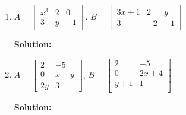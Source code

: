 \begin{enumerate}
\begin{banswer}
        \begin{tcolorbox}
            \centering
            $x=1,\qquad y=2$
        \end{tcolorbox}
    \end{banswer}

    \item 
    $A = \begin{bmatrix}
        x^3 & 2 & 0 \\
        3 & y & -1
    \end{bmatrix}$, \quad
    $B = \begin{bmatrix}
        3x + 1 & 2 & y \\
        3 & -2 & -1
    \end{bmatrix}$

    \textbf{Solution:}
    \begin{banswer}
    \end{banswer}

    \item 
    $A = \begin{bmatrix}
        2 & -5 \\
        0 & x + y \\
        2y & 3
    \end{bmatrix}$, \quad
    $B = \begin{bmatrix}
        2 & -5 \\    
        0 & 2x + 4 \\    
        y + 1 & 1 \\    
    \end{bmatrix}$

    \textbf{Solution:}

    \end{enumerate}
